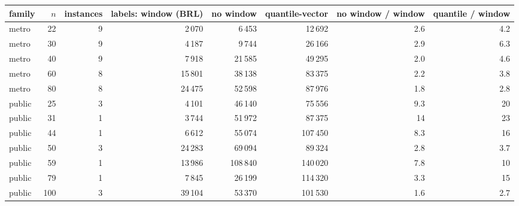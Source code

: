 \begin{tabular}{lrrrrrrr}
\toprule
family & $n$ & instances & labels: window (BRL) & no window & quantile-vector & no window / window & quantile / window \\
\midrule
metro & 22 & 9 & 2\,070 & 6\,453 & 12\,692 & 2.6 & 4.2 \\
metro & 30 & 9 & 4\,187 & 9\,744 & 26\,166 & 2.9 & 6.3 \\
metro & 40 & 9 & 7\,918 & 21\,585 & 49\,295 & 2.0 & 4.6 \\
metro & 60 & 8 & 15\,801 & 38\,138 & 83\,375 & 2.2 & 3.8 \\
metro & 80 & 8 & 24\,475 & 52\,598 & 87\,976 & 1.8 & 2.8 \\
public & 25 & 3 & 4\,101 & 46\,140 & 75\,556 & 9.3 & 20 \\
public & 31 & 1 & 3\,744 & 51\,972 & 87\,375 & 14 & 23 \\
public & 44 & 1 & 6\,612 & 55\,074 & 107\,450 & 8.3 & 16 \\
public & 50 & 3 & 24\,283 & 69\,094 & 89\,324 & 2.8 & 3.7 \\
public & 59 & 1 & 13\,986 & 108\,840 & 140\,020 & 7.8 & 10 \\
public & 79 & 1 & 7\,845 & 26\,199 & 114\,320 & 3.3 & 15 \\
public & 100 & 3 & 39\,104 & 53\,370 & 101\,530 & 1.6 & 2.7 \\
\bottomrule
\end{tabular}
